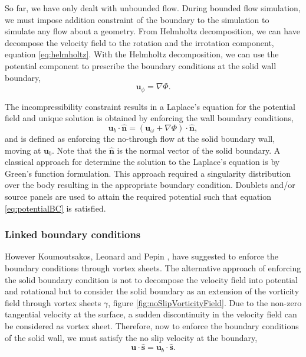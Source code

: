 So far, we have only dealt with unbounded flow. During bounded flow simulation, we must impose addition constraint of the boundary to the simulation to simulate any flow about a geometry. From Helmholtz decomposition, we can have decompose the velocity field to the rotation and the irrotation component, equation \ref{eq:helmholtz}. With the Helmholtz decomposition, we can use the potential component to prescribe the boundary conditions at the solid wall boundary,
	\begin{equation}
	\mathbf{u}_{\phi} = \nabla\Phi.
	\end{equation}

The incompressibility constraint results in a Laplace's equation for the potential field and unique solution is obtained by enforcing the wall boundary conditions,
	\begin{equation}
	\mathbf{u}_b\cdot\mathbf{\hat{n}} = \left(\mathbf{u}_{\omega} + \nabla\Phi\right) \cdot \mathbf{\hat{n}},
	\label{eq:potentialBC}
	\end{equation}
and is defined as enforcing the no-through flow at the solid boundary wall, moving at $\mathbf{u}_b$. Note that the $\mathbf{\hat{n}}$ is the normal vector of the solid boundary. A classical approach for determine the solution to the Laplace's equation is by Green's function formulation. This approach required a singularity distribution over the body resulting in the appropriate boundary condition. Doublets and/or source panels are used to attain the required potential such that equation \ref{eq:potentialBC} is satisfied.

\subsubsection{Linked boundary conditions}

However Koumoutsakos, Leonard and Pepin \cite{Koumoutsakos1994b}, have suggested to enforce the boundary conditions through vortex sheets. The alternative approach of enforcing the solid boundary condition is not to decompose the velocity field into potential and rotational but to consider the solid boundary as an extension of the vorticity field through vortex sheets $\gamma$, figure \ref{fig:noSlipVorticityField}. Due to the non-zero tangential velocity at the surface, a sudden discontinuity in the velocity field can be considered as vortex sheet. Therefore, now to enforce the boundary conditions of the solid wall, we must satisfy the no slip velocity at the boundary,
	\begin{equation}
	\mathbf{u}\cdot\mathbf{\hat{s}} = \mathbf{u}_b\cdot\mathbf{\hat{s}}.
	\end{equation}


